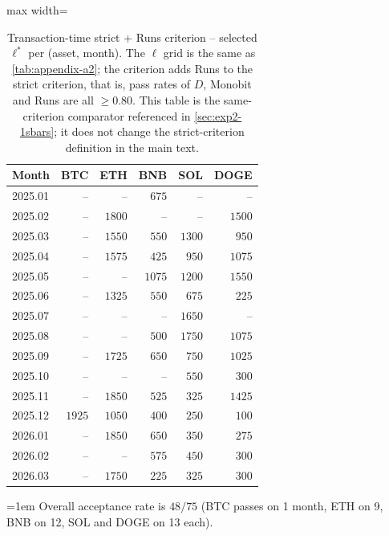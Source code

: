 \documentclass[11pt,titlepage,openany,oneside]{book}  %
\newcommand{\floatnote}[1]{%
  \par\smallskip\noindent%
  \begin{minipage}{\linewidth}%
    \footnotesize\emergencystretch=1em #1%
  \end{minipage}\par%
}
\begin{document}
\begin{table}[!htbp]
  \caption[Transaction-time strict + Runs criterion -- selected $\ell^*$]{Transaction-time strict + Runs criterion -- selected $\ell^*$ per (asset, month). The $\ell$ grid is the same as \cref{tab:appendix-a2}; the criterion adds Runs to the strict criterion, that is, pass rates of $D$, Monobit and Runs are all $\geq 0.80$. This table is the same-criterion comparator referenced in \cref{sec:exp2-1sbars}; it does not change the strict-criterion definition in the main text.}
  \label{tab:appendix-a3}
  \begin{center}
    \begin{adjustbox}{max width=\textwidth}
    \begin{tabular}{lrrrrr}
      \toprule
      Month   & BTC    & ETH    & BNB    & SOL    & DOGE   \\
      \midrule
      2025.01 & --     & --     & $675$  & --     & --     \\
      2025.02 & --     & $1800$ & --     & --     & $1500$ \\
      2025.03 & --     & $1550$ & $550$  & $1300$ & $950$  \\
      2025.04 & --     & $1575$ & $425$  & $950$  & $1075$ \\
      2025.05 & --     & --     & $1075$ & $1200$ & $1550$ \\
      2025.06 & --     & $1325$ & $550$  & $675$  & $225$  \\
      2025.07 & --     & --     & --     & $1650$ & --     \\
      2025.08 & --     & --     & $500$  & $1750$ & $1075$ \\
      2025.09 & --     & $1725$ & $650$  & $750$  & $1025$ \\
      2025.10 & --     & --     & --     & $550$  & $300$  \\
      2025.11 & --     & $1850$ & $525$  & $325$  & $1425$ \\
      2025.12 & $1925$ & $1050$ & $400$  & $250$  & $100$  \\
      2026.01 & --     & $1850$ & $650$  & $350$  & $275$  \\
      2026.02 & --     & --     & $575$  & $450$  & $300$  \\
      2026.03 & --     & $1750$ & $225$  & $325$  & $300$  \\
      \bottomrule
    \end{tabular}
    \end{adjustbox}
  \end{center}
  \floatnote{Overall acceptance rate is $48/75$ (BTC passes on 1 month, ETH on 9, BNB on 12, SOL and DOGE on 13 each).}
\end{table}
\end{document}
